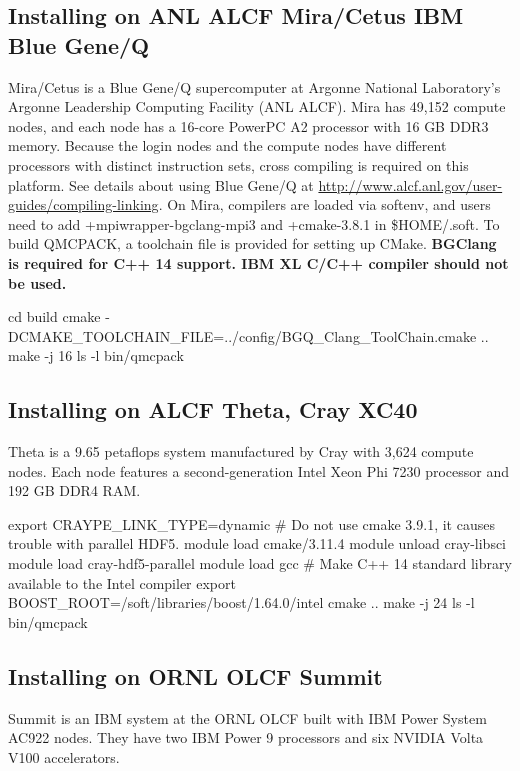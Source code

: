 \subsection{Installing on ANL ALCF Mira/Cetus IBM Blue Gene/Q}
\label{sec:buildbgq}
Mira/Cetus is a Blue Gene/Q supercomputer at Argonne National Laboratory's Argonne Leadership Computing Facility (ANL ALCF).
Mira has 49,152 compute nodes, and each node has a 16-core PowerPC A2 processor with 16 GB DDR3 memory.
Because the login nodes and the compute nodes have different processors with distinct instruction sets,
cross compiling is required on this platform. See details about using Blue Gene/Q at \url{http://www.alcf.anl.gov/user-guides/compiling-linking}.
On Mira, compilers are loaded via softenv, and users need to add +mpiwrapper-bgclang-mpi3 and +cmake-3.8.1 in \$HOME/.soft.
To build QMCPACK, a toolchain file is provided for setting up CMake.
\textbf{BGClang is required for C++ 14 support. IBM XL C/C++ compiler should not be used.}

%
\begin{shade}
cd build
cmake -DCMAKE_TOOLCHAIN_FILE=../config/BGQ_Clang_ToolChain.cmake ..
make -j 16
ls -l bin/qmcpack
\end{shade}

\subsection{Installing on ALCF Theta, Cray XC40}
Theta is a 9.65 petaflops system manufactured by Cray with 3,624 compute nodes.
Each node features a second-generation Intel Xeon Phi 7230 processor and 192 GB DDR4 RAM.

%
\begin{shade}
export CRAYPE_LINK_TYPE=dynamic
# Do not use cmake 3.9.1, it causes trouble with parallel HDF5.
module load cmake/3.11.4
module unload cray-libsci
module load cray-hdf5-parallel
module load gcc   # Make C++ 14 standard library available to the Intel compiler
export BOOST_ROOT=/soft/libraries/boost/1.64.0/intel
cmake ..
make -j 24
ls -l bin/qmcpack
\end{shade}

\subsection{Installing on ORNL OLCF Summit}
Summit is an IBM system at the ORNL OLCF built with IBM Power System AC922
nodes. They have two IBM Power 9 processors and six NVIDIA Volta V100
accelerators.

